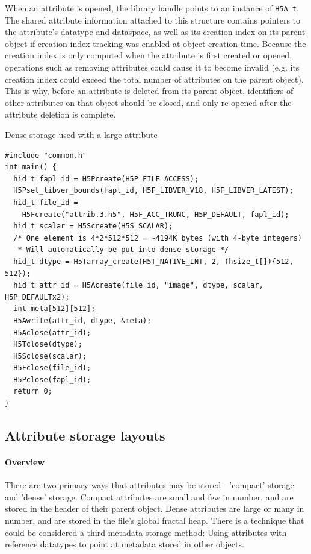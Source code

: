 When an attribute is opened, the library handle points to an instance of \texttt{H5A\_t}. The shared attribute information attached to this structure contains pointers to the attribute's datatype and dataspace, as well as its creation index on its parent object if creation index tracking was enabled at object creation time. Because the creation index is only computed when the attribute is first created or opened, operations such as removing attributes could cause it to become invalid (e.g. its creation index could exceed the total number of attributes on the parent object). This is why, before an attribute is deleted from its parent object, identifiers of other attributes on that object should be closed, and only re-opened after the attribute deletion is complete.

\begin{listing}
\centering
\caption{Dense storage used with a large attribute}
\label{lst:attribute-dense-storage-large}
\begin{verbatim}
#include "common.h"
int main() {
  hid_t fapl_id = H5Pcreate(H5P_FILE_ACCESS);
  H5Pset_libver_bounds(fapl_id, H5F_LIBVER_V18, H5F_LIBVER_LATEST);
  hid_t file_id = 
    H5Fcreate("attrib.3.h5", H5F_ACC_TRUNC, H5P_DEFAULT, fapl_id);
  hid_t scalar = H5Screate(H5S_SCALAR);
  /* One element is 4*2*512*512 = ~4194K bytes (with 4-byte integers)
   * Will automatically be put into dense storage */
  hid_t dtype = H5Tarray_create(H5T_NATIVE_INT, 2, (hsize_t[]){512, 512});
  hid_t attr_id = H5Acreate(file_id, "image", dtype, scalar, H5P_DEFAULTx2);
  int meta[512][512];
  H5Awrite(attr_id, dtype, &meta);
  H5Aclose(attr_id);
  H5Tclose(dtype);
  H5Sclose(scalar);
  H5Fclose(file_id);
  H5Pclose(fapl_id);
  return 0;
}
\end{verbatim}
\end{listing}


\subsection{Attribute storage layouts} 

\paragraph{Overview} There are two primary ways that attributes may be stored - 'compact' storage and 'dense' storage. Compact attributes are small and few in number, and are stored in the header of their parent object. Dense attributes are large or many in number, and are stored in the file's global fractal heap. There is a technique that could be considered a third metadata storage method: Using attributes with reference datatypes to point at metadata stored in other objects. 

